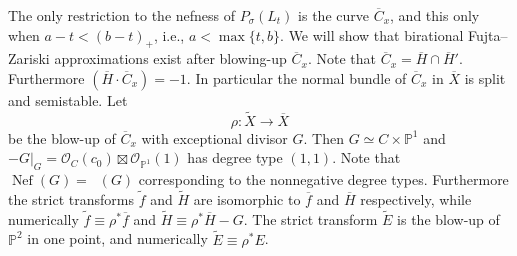 \documentclass[12pt]{amsart}
\theoremstyle{definition}
\newcommand{\bb}{\ensuremath{\mathfrak{b}}}
\DeclareMathOperator{\Nef}{Nef}
\DeclareMathOperator{\Eff}{\overline{Eff}}
\newcommand{\?}{ \circled{{\large\bf ?}}}
\let\cal\mathcal
\let\bb\mathbb
\begin{document}
The only restriction to the nefness of $P_{\sigma}(L_t)$ is the curve $\overline C_x$, and this only when $a-t<(b-t)_+$, i.e., $a<\max\{t,b\}$. We will show that birational Fujta--Zariski approximations exist after blowing-up $\overline C_x$. Note that $\overline C_x=\overline H\cap\overline H'$. Furthermore $(\overline H\cdot \overline C_x)=-1$. In particular the normal bundle of $\overline C_x$ in $\overline X$ is split and semistable. Let 
\[\rho:\widetilde X\to\overline X\]
be the blow-up of $\overline C_x$ with exceptional divisor $G$. Then $G\simeq C\times\bb P^1$ and $-G|_G=\cal O_C(c_0)\boxtimes\cal O_{\bb P^1}(1)$ has degree type $(1,1)$. Note that $\Nef(G)=\Eff(G)$ corresponding to the nonnegative degree types. Furthermore the strict transforms $\widetilde f$ and $\widetilde H$ are isomorphic to $\overline f$ and $\overline H$ respectively, while numerically $\widetilde f\equiv\rho^*\overline f$ and $\widetilde H\equiv\rho^*\overline H-G$. The strict transform $\widetilde E$ is the blow-up of $\bb P^2$ in one point, and numerically $\widetilde E\equiv\rho^*E$.
\end{document}
